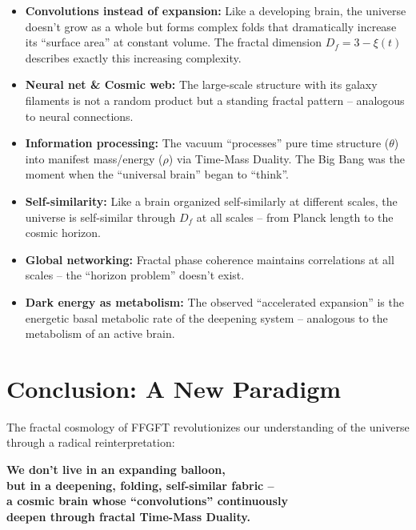 \begin{itemize}[leftmargin=*]
\item \textbf{Convolutions instead of expansion:} Like a developing brain, the universe doesn't grow as a whole but forms complex folds that dramatically increase its ``surface area'' at constant volume. The fractal dimension $D_f = 3 - \xi(t)$ describes exactly this increasing complexity.

\item \textbf{Neural net \& Cosmic web:} The large-scale structure with its galaxy filaments is not a random product but a standing fractal pattern -- analogous to neural connections.

\item \textbf{Information processing:} The vacuum ``processes'' pure time structure ($\theta$) into manifest mass/energy ($\rho$) via Time-Mass Duality. The Big Bang was the moment when the ``universal brain'' began to ``think''.

\item \textbf{Self-similarity:} Like a brain organized self-similarly at different scales, the universe is self-similar through $D_f$ at all scales -- from Planck length to the cosmic horizon.

\item \textbf{Global networking:} Fractal phase coherence maintains correlations at all scales -- the ``horizon problem'' doesn't exist.

\item \textbf{Dark energy as metabolism:} The observed ``accelerated expansion'' is the energetic basal metabolic rate of the deepening system -- analogous to the metabolism of an active brain.
\end{itemize}

\section{Conclusion: A New Paradigm}

The fractal cosmology of FFGFT revolutionizes our understanding of the universe through a radical reinterpretation:

\begin{center}
\textbf{We don't live in an expanding balloon,} \\
\textbf{but in a deepening, folding, self-similar fabric --} \\
\textbf{a cosmic brain whose ``convolutions'' continuously} \\
\textbf{deepen through fractal Time-Mass Duality.}
\end{center}

